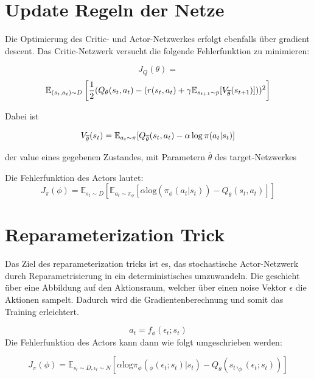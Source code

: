 \documentclass[8pt]{article}
\begin{document}
\begin{multicols}{2}
\section{Update Regeln der Netze}
Die Optimierung des Critic- und Actor-Netzwerkes erfolgt ebenfalls über gradient descent. Das Critic-Netzwerk versucht die folgende Fehlerfunktion zu minimieren:

\begin{equation}
J_{Q}(\theta)=
\end{equation}
\begin{equation}
\mathbb{E}_{(s_{t},a_{t})\sim D}\left[\frac{1}{2}(Q_{\theta}(s_{t},a_{t})-(r(s_{t},a_{t})+\gamma \mathbb{E}_{s_{t+1}\sim p}[V_{\overline{\theta}}(s_{t+1})]))^{2}\right]\notag
\end{equation}

Dabei ist

\begin{equation}
	\mathnormal{V}_{\overline{\theta}}(s_{t}) = \mathbb{E}_{a_t \sim \pi}[\mathnormal{Q}_{\overline{\theta}}(s_t, a_t) - \alpha \, \mathrm{log} \, \pi (a_t|s_t)]
\end{equation}

der value eines gegebenen Zustandes, mit Parametern $\overline{\theta}$ des target-Netzwerkes

Die Fehlerfunktion des Actors lautet:
\begin{equation}
J_{\pi}(\phi)=\mathbb{E}_{s_{t}\sim D}\left[\mathbb{E}_{a_{t}\sim \pi_{\phi}}\left[\alpha \mathrm{log}(\pi_{\phi}(a_{t}|s_{t}))-Q_{\theta}(s_{t},a_{t})\right]\right]
\end{equation}

\section{Reparameterization Trick}
Das Ziel des reparameterization tricks ist es, das stochastische Actor-Netzwerk durch Reparametrisierung in ein deterministisches umzuwandeln. Die geschieht über eine Abbildung auf den Aktionsraum, welcher über einen noise Vektor $\epsilon$ die Aktionen sampelt. Dadurch wird die Gradientenberechnung und somit das Training erleichtert.

\begin{equation}
a_{t}=f_{\phi}(\epsilon_{t};s_{t})
\end{equation}
Die Fehlerfunktion des Actors kann dann wie folgt umgeschrieben werden:

\begin{equation}
J_{\pi}(\phi)=\mathbb{E}_{s_{t}\sim D,\epsilon_{t}\sim N}\left[\alpha\mathrm{log}\pi_{\phi}(_{\phi}(\epsilon_{t};s_{t})|s_{t})-Q_{\theta}(s_{t},_{\phi}(\epsilon_{t};s_{t}))\right]
\end{equation}



\end{multicols}
\end{document}
